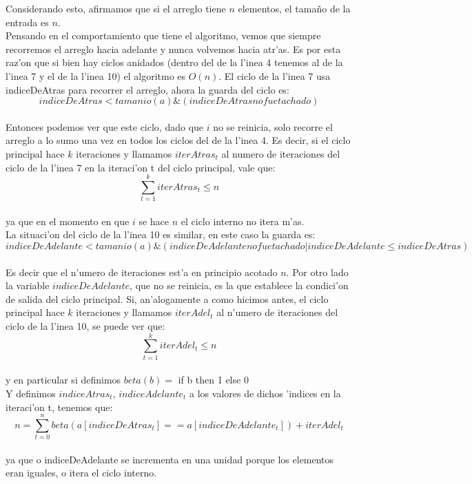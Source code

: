 Considerando esto, afirmamos que si el arreglo tiene $n$ elementos, el tama\~{n}o de la entrada es $n$.\\
Pensando en el comportamiento que tiene el algoritmo, vemos que siempre recorremos el arreglo hacia adelante 
y nunca volvemos hacia atr'as. Es por esta raz'on que si bien hay ciclos anidados (dentro del de la l'inea 
4 tenemos al de la l'inea 7 y el de la l'inea 10) el algoritmo es $O(n)$.
El ciclo de la l'inea 7 usa indiceDeAtras para recorrer el arreglo, ahora la guarda del ciclo es:\\
$$indiceDeAtras < tamanio(a) \& (indiceDeAtras no fue tachado)$$\\ 
Entonces podemos ver que este ciclo, dado que $i$ no se reinicia, solo recorre el arreglo a lo sumo una 
vez en todos los ciclos del de la l'inea 4. Es decir, si el ciclo principal hace $k$ iteraciones y llamamos 
$iterAtras_t$ al numero de iteraciones del ciclo de la l'inea 7 en la iteraci'on t del ciclo principal, vale que:\\
$$\sum_{t=1}^{k}iterAtras_t \leq n$$\\
ya que en el momento en que $i$ se hace $n$ el ciclo interno no itera m'as.\\
La situaci'on del ciclo de la l'inea 10 es similar, en este caso la guarda es:\\
$$indiceDeAdelante < tamanio(a) \& (indiceDeAdelante no fue tachado | indiceDeAdelante \leq indiceDeAtras)$$\\
Es decir que el n'umero de iteraciones est'a en principio acotado $n$. Por otro lado la variable $indiceDeAdelante$, 
que no se reinicia, es la que establece la condici'on de salida del ciclo principal. Si, an'alogamente a como hicimos 
antes, el ciclo principal hace $k$ iteraciones y llamamos $iterAdel_t$ al n'umero de iteraciones del ciclo de 
la l'inea 10, se puede ver que:\\
$$\sum_{t=1}^{k}iterAdel_t \leq n$$\\
y en particular si definimos
$beta(b) =$ if b then 1 else 0 \\
Y definimos $indiceAtras_t$, $indiceAdelante_t$ a los valores de dichos 'indices en la iteraci'on t, tenemos que:\\
$$n=\sum_{t=0}^{n}beta(a[indiceDeAtras_t] == a[indiceDeAdelante_t])+ iterAdel_t$$\\
ya que o indiceDeAdelante se incrementa en una unidad porque los elementos eran iguales, o itera el ciclo interno.\\

